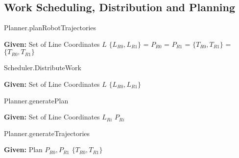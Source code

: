 
\subsection{Work Scheduling, Distribution and Planning}
\label{sec:software_sdp}


\begin{algorithm}[t!]
\caption{Planner.planRobotTrajectories}
\label{algo:sdp_overview}
\begin{algorithmic}[1]  
\State \textbf{Given:} Set of Line Coordinates $L$ 
\State $\{L_{R0}, L_{R1}\}$ = 
\State $P_{R0}$ = 
\State $P_{R1}$ = 
\State $\{T_{R0}, T_{R1}\}$ = 
\State \Return $\{T_{R0}, T_{R1}\}$
\end{algorithmic}
\end{algorithm}

\begin{algorithm}[t!]
\caption{Scheduler.DistributeWork}
\label{algo:distribute}
\begin{algorithmic}[1]  
\State \textbf{Given:} Set of Line Coordinates $L$ 
\State {}
\State \Return $\{L_{R0}, L_{R1}\}$
\end{algorithmic}
\end{algorithm}

\begin{algorithm}[t!]
\caption{Planner.generatePlan}
\label{algo:generatePlan}
\begin{algorithmic}[1]  
\State \textbf{Given:} Set of Line Coordinates $L_{Ri}$ 
\State {}
\State \Return $P_{Ri}$
\end{algorithmic}
\end{algorithm}

\begin{algorithm}[t!]
\caption{Planner.generateTrajectories}
\label{algo:generateTrajs}
\begin{algorithmic}[1]  
\State \textbf{Given:} Plan $P_{R0}, P_{R1}$ 
\State {}
\State \Return $\{T_{R0}, T_{R1}\}$
\end{algorithmic}
\end{algorithm}